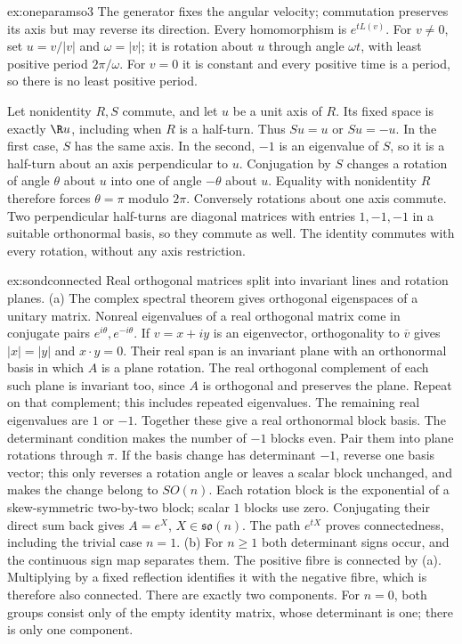 \begin{solution}{ex:oneparamso3}
\idea The generator fixes the angular velocity; commutation preserves its
axis but may reverse its direction.
\writeup Every homomorphism is $e^{tL(v)}$.
For $v\ne0$, set $u=v/|v|$ and $\omega=|v|$; it is rotation about $u$
through angle $\omega t$, with least positive period $2\pi/\omega$.
For $v=0$ it is constant and every positive time is a period, so there
is no least positive period.

Let nonidentity $R,S$ commute, and let $u$ be a unit axis of $R$.
Its fixed space is exactly $\R u$, including when $R$ is a half-turn.
Thus $Su=u$ or $Su=-u$.
In the first case, $S$ has the same axis. In the second, $-1$ is an
eigenvalue of $S$, so it is a half-turn about an axis perpendicular to
$u$. Conjugation by $S$ changes a rotation of angle $\theta$ about $u$
into one of angle $-\theta$ about $u$.
Equality with nonidentity $R$ therefore forces $\theta=\pi$ modulo $2\pi$.
Conversely rotations about one axis commute. Two perpendicular half-turns
are diagonal matrices with entries $1,-1,-1$ in a suitable orthonormal
basis, so they commute as well.
The identity commutes with every rotation, without any axis restriction.
\end{solution}
\begin{solution}{ex:sondconnected}
\idea Real orthogonal matrices split into invariant lines and rotation planes.
\writeup (a) The complex spectral theorem gives orthogonal eigenspaces
of a unitary matrix. Nonreal eigenvalues of a real orthogonal matrix
come in conjugate pairs $e^{i\theta},e^{-i\theta}$.
If $v=x+iy$ is an eigenvector, orthogonality to $\overline v$ gives
$|x|=|y|$ and $x\cdot y=0$. Their real span is an invariant plane with
an orthonormal basis in which $A$ is a plane rotation.
The real orthogonal complement of each such plane is invariant too,
since $A$ is orthogonal and preserves the plane. Repeat on that complement;
this includes repeated eigenvalues. The remaining real eigenvalues are
$1$ or $-1$. Together these give a real orthonormal block basis.
The determinant condition makes the number of $-1$ blocks even.
Pair them into plane rotations through $\pi$.
If the basis change has determinant $-1$, reverse one basis vector;
this only reverses a rotation angle or leaves a scalar block unchanged,
and makes the change belong to $SO(n)$.
Each rotation block is the exponential of a skew-symmetric two-by-two
block; scalar $1$ blocks use zero. Conjugating their direct sum back
gives $A=e^X$, $X\in\mathfrak{so}(n)$.
The path $e^{tX}$ proves connectedness, including the trivial case $n=1$.
(b) For $n\ge1$ both determinant signs occur, and the continuous
sign map separates them. The positive fibre is connected by (a).
Multiplying by a fixed reflection identifies it with the negative fibre,
which is therefore also connected. There are exactly two components.
For $n=0$, both groups consist only of the empty identity matrix,
whose determinant is one; there is only one component.
\end{solution}
